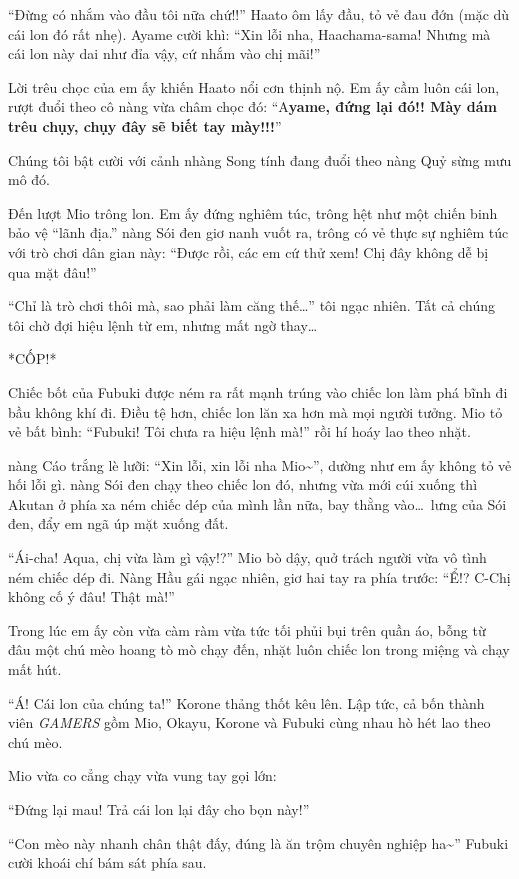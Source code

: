 \documentclass[../main.tex]{subfiles}
\begin{document}
``Đừng có nhắm vào đầu tôi nữa chứ!!'' Haato ôm lấy đầu, tỏ vẻ đau đớn (mặc dù cái lon đó rất nhẹ). Ayame cười khì: ``Xin lỗi nha, Haachama-sama! Nhưng mà cái lon này dai như đỉa vậy, cứ nhắm vào chị mãi!''

Lời trêu chọc của em ấy khiến Haato nổi cơn thịnh nộ. Em ấy cầm luôn cái lon, rượt đuổi theo cô nàng vừa châm chọc đó: ``A\textbf{yame, đứng lại đó!! Mày dám trêu chụy, chụy đây sẽ biết tay mày!!!}''

Chúng tôi bật cười với cảnh nhàng Song tính đang đuổi theo nàng Quỷ sừng mưu mô đó.

\ct

Đến lượt Mio trông lon. Em ấy đứng nghiêm túc, trông hệt như một chiến binh bảo vệ ``lãnh địa.'' nàng Sói đen giơ nanh vuốt ra, trông có vẻ thực sự nghiêm túc với trò chơi dân gian này: ``Được rồi, các em cứ thử xem! Chị đây không dễ bị qua mặt đâu!''

``Chỉ là trò chơi thôi mà, sao phải làm căng thế\dots'' tôi ngạc nhiên. Tất cả chúng tôi chờ đợi hiệu lệnh từ em, nhưng mất ngờ thay\dots

*CỐP!*

Chiếc bốt của Fubuki được ném ra rất mạnh trúng vào chiếc lon làm phá bĩnh đi bầu không khí đi. Điều tệ hơn, chiếc lon lăn xa hơn mà mọi người tưởng. Mio tỏ vẻ bất bình: ``Fubuki! Tôi chưa ra hiệu lệnh mà!'' rồi hí hoáy lao theo nhặt.

nàng Cáo trắng lè lưỡi: ``Xin lỗi, xin lỗi nha Mio\~{}'', dường như em ấy không tỏ vẻ hối lỗi gì. nàng Sói đen chạy theo chiếc lon đó, nhưng vừa mới cúi xuống thì Akutan ở phía xa ném chiếc dép của mình lần nữa, bay thằng vào\dots\ lưng của Sói đen, đẩy em ngã úp mặt xuống đất.

``Ái-cha! Aqua, chị vừa làm gì vậy!?'' Mio bò dậy, quở trách người vừa vô tình ném chiếc dép đi. Nàng Hầu gái ngạc nhiên, giơ hai tay ra phía trước: ``Ể!? C-Chị không cố ý đâu! Thật mà!''

Trong lúc em ấy còn vừa càm ràm vừa tức tối phủi bụi trên quần áo, bỗng từ đâu một chú mèo hoang tò mò chạy đến, nhặt luôn chiếc lon trong miệng và chạy mất hút.

``Á! Cái lon của chúng ta!'' Korone thảng thốt kêu lên. Lập tức, cả bốn thành viên \textit{GAMERS} gồm Mio, Okayu, Korone và Fubuki cùng nhau hò hét lao theo chú mèo.

Mio vừa co cẳng chạy vừa vung tay gọi lớn:

``Đứng lại mau! Trả cái lon lại đây cho bọn này!''

``Con mèo này nhanh chân thật đấy, đúng là ăn trộm chuyên nghiệp ha\~{}'' Fubuki cười khoái chí bám sát phía sau.
\end{document}
